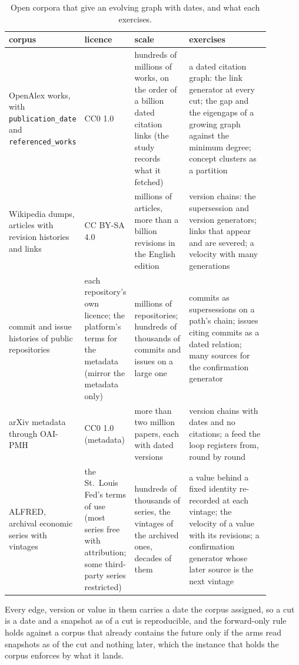 \documentclass[11pt,a4paper]{article}
\theoremstyle{plain}
\theoremstyle{definition}
\theoremstyle{remark}
\begin{document}
\begin{table}[h]
\centering
\small
\begin{tabular}{p{0.19\linewidth}p{0.16\linewidth}p{0.21\linewidth}p{0.32\linewidth}}
\toprule
corpus & licence & scale & exercises \\
\midrule
OpenAlex works, with \texttt{publication\_date} and \texttt{referenced\_works}
  & CC0 1.0
  & hundreds of millions of works, on the order of a billion dated citation links (the study records what it fetched)
  & a dated citation graph: the link generator at every cut; the gap and the eigengaps of a growing graph against the minimum degree; concept clusters as a partition \\
Wikipedia dumps, articles with revision histories and links
  & CC BY-SA 4.0
  & millions of articles, more than a billion revisions in the English edition
  & version chains: the supersession and version generators; links that appear and are severed; a velocity with many generations \\
commit and issue histories of public repositories
  & each repository's own licence; the platform's terms for the metadata (mirror the metadata only)
  & millions of repositories; hundreds of thousands of commits and issues on a large one
  & commits as supersessions on a path's chain; issues citing commits as a dated relation; many sources for the confirmation generator \\
arXiv metadata through OAI-PMH
  & CC0 1.0 (metadata)
  & more than two million papers, each with dated versions
  & version chains with dates and no citations; a feed the loop registers from, round by round \\
ALFRED, archival economic series with vintages
  & the St.\ Louis Fed's terms of use (most series free with attribution; some third-party series restricted)
  & hundreds of thousands of series, the vintages of the archived ones, decades of them
  & a value behind a fixed identity re-recorded at each vintage; the velocity of a value with its revisions; a confirmation generator whose later source is the next vintage \\
\bottomrule
\end{tabular}
\caption{Open corpora that give an evolving graph with dates, and what each exercises.}
\label{tab:datasets}
\end{table}

Every edge, version or value in them carries a date the corpus assigned, so a cut is a date and a
snapshot as of a cut is reproducible, and the forward-only rule holds against a corpus that already
contains the future only if the arms read snapshots as of the cut and nothing later, which the
instance that holds the corpus enforces by what it lands.
\end{document}
